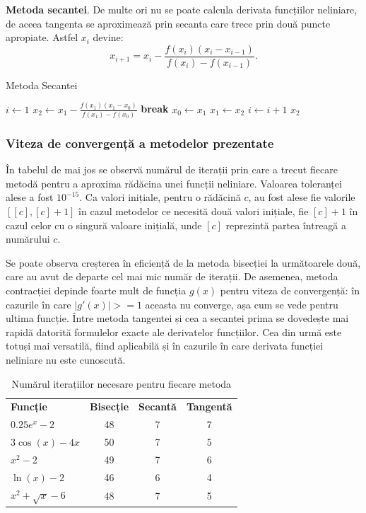 \documentclass{exam}
\begin{document}
\textbf{Metoda secantei}. De multe ori nu se poate calcula derivata funcțiilor neliniare, de aceea tangenta se aproximează prin secanta care trece prin două puncte apropiate. Astfel $x_i$ devine:
$$x_{i+1}=x_i - \frac{f(x_i)(x_i - x_{i - 1})}{f(x_i)-f(x_{i - 1})}.$$


\begin{algorithm}[H]
    \caption{Metoda Secantei}
    \begin{algorithmic}[1]
        \State $i \gets 1$
            \State $x_2 \gets x_1 - \frac{f(x_1)(x_1 - x_0)}{f(x_1) - f(x_0)}$
                \State \textbf{break}
            \EndIf
            \State $x_0 \gets x_1$
            \State $x_1 \gets x_2$
            \State $i \gets i + 1$
        \EndWhile
        \State \Return $x_2$
    \end{algorithmic}
\end{algorithm}

\subsubsection{Viteza de convergență a metodelor prezentate}

În tabelul de mai jos se observă numărul de iterații prin care a trecut fiecare metodă pentru a aproxima rădăcina unei funcții neliniare. Valoarea toleranței alese a fost $10^{-15}$. Ca valori inițiale, pentru o rădăcină $c$, au fost alese fie valorile $[[c], [c] + 1]$ în cazul metodelor ce necesită două valori inițiale, fie $[c] + 1$ în cazul celor cu o singură valoare inițială, unde $[c]$ reprezintă partea întreagă a numărului $c$.

Se poate observa creșterea în eficiență de la metoda bisecției la următoarele două, care au avut de departe cel mai mic număr de iterații. De asemenea, metoda contracției depinde foarte mult de funcția $g(x)$ pentru viteza de convergență: în cazurile în care $|g'(x) | >= 1$ aceasta nu converge, așa cum se vede pentru ultima funcție. Între metoda tangentei și cea a secantei prima se dovedește mai rapidă datorită formulelor exacte ale derivatelor funcțiilor. Cea din urmă este totuși mai versatilă, fiind aplicabilă și în cazurile în care derivata funcției neliniare nu este cunoscută.

\begin{table}[h]
\centering
\label{tab:root_finding}
\begin{tabular}{lccc}
\textbf{Funcție} & \textbf{Bisecție} & \textbf{Secantă} & \textbf{Tangentă}\\
$0.25e^x - 2$ & 48 & 7 & 7 \\
$3\cos(x) - 4x$ & 50 & 7 & 5 \\
$x^2 - 2$ & 49 & 7 & 6\\
$\ln(x) - 2$ & 46 & 6 & 4\\
$ x^2 + \sqrt{x}- 6$ & 48 & 7 & 5 \\
\end{tabular}
\caption{Numărul iterațiilor necesare pentru fiecare metoda}
\end{table}
\end{document}
